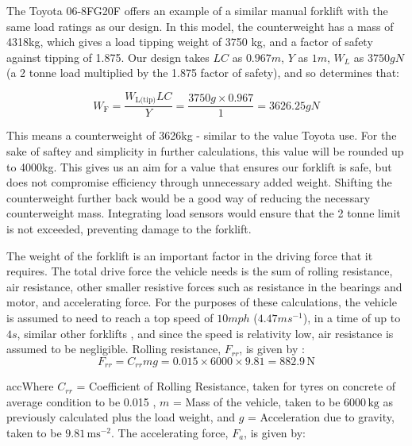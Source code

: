 \documentclass[12pt,titlepage]{article}
\begin{document}
The Toyota 06-8FG20F \cite{Toyota} offers an example of a similar manual forklift with the same load ratings as our design. In this model, the counterweight has a mass of 4318kg, which gives a load tipping weight of 3750 kg, and a factor of safety against tipping of 1.875. Our design takes $LC$ as $0.967m$, $Y$ as $1m$, $W_L$ as $3750gN$ (a 2 tonne load multiplied by the 1.875 factor of safety), and so determines that:

\vspace{-22pt}
\begin{equation}
    W_{\text{F}} = \frac{W_{\text{L(tip)}}LC}{Y} = \frac{3750g \times 0.967}{1} = 3626.25gN
\end{equation}
\vspace{-31pt}

This means a counterweight of 3626kg - similar to the value Toyota use. For the sake of saftey and simplicity in further calculations, this value will be rounded up to 4000kg. This gives us an aim for a value that ensures our forklift is safe, but does not compromise efficiency through unnecessary added weight. Shifting the  counterweight further back would be a good way of reducing the necessary counterweight mass. Integrating load sensors would ensure that the 2 tonne limit is not exceeded, preventing damage to the forklift.

The weight of the forklift is an important factor in the driving force that it requires. The total drive force the vehicle needs is the sum of rolling resistance, air resistance, other smaller resistive forces such as resistance in the bearings and motor, and accelerating force. For the purposes of these calculations, the vehicle is assumed to need to reach a top speed of $10mph$ ($4.47ms^{-1}$), in a time of up to $4s$, similar other forklifts \cite{Forklift_Acceleration_Example}, and since the speed is relativity low, air resistance is assumed to be negligible. Rolling resistance, $F_{rr}$, is given by \cite{Vehicle_Dynamics_And_Control}:
\vspace{-17pt}
\begin{equation}
    F_{rr} = C_{rr} m g = 0.015 \times 6000 \times 9.81 =  882.9 \, \text{N}
\end{equation}
\vspace{-37pt}

accWhere \( C_{rr} \) = Coefficient of Rolling Resistance, taken for tyres on concrete of average condition to be 0.015  \cite{Rolling_Resistance}, \( m \) = Mass of the vehicle, taken to be \( 6000 \, \text{kg} \) as previously calculated plus the load weight, and \( g \) = Acceleration due to gravity, taken to be \( 9.81 \, \text{ms}^{-2} \). The accelerating force, \( F_a \), is given by:
\end{document}
